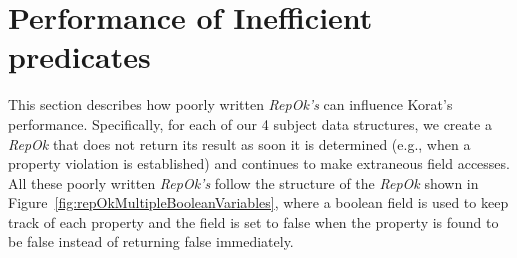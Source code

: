 \section{Performance of Inefficient predicates}
\label{sec:performance-of-inefficient-predicates}
This section describes how poorly written \emph{RepOk's} can influence
Korat's performance.  Specifically, for each of our 4 subject data
structures, we create a \emph{RepOk} that does not return its result as soon
it is determined (e.g., when a property violation is established) and
continues to make extraneous field accesses.  All these poorly written
\emph{RepOk's} follow the structure of the \emph{RepOk} shown in
Figure~\ref{fig:repOkMultipleBooleanVariables}, where a boolean field
is used to keep track of each property and the field is set to false
when the property is found to be false instead of returning false
immediately.

